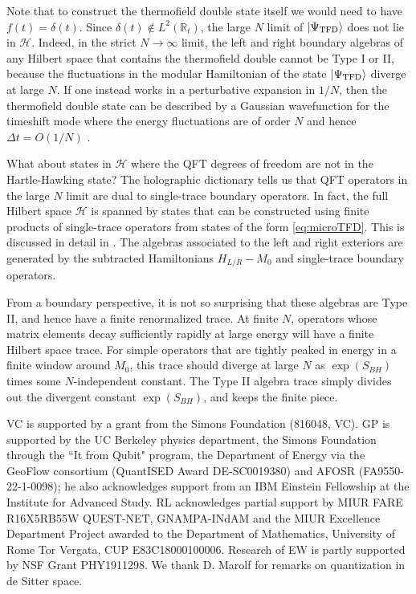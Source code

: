\documentclass[11pt,a4paper]{article}
\def\R{{\mathbb R}}
\def\TFD{{\mathrm{TFD}}}
\begin{document}
Note that to construct the thermofield double state itself we would need to have $f(t) = \delta(t)$. Since $\delta(t) \not\in L^2(\R_t)$, the large $N$ limit of $\ket{ \Psi_\TFD}$ does not lie in $\mathcal{H}$. Indeed, in the strict $N \to \infty$ limit, the left and right boundary algebras of any Hilbert space that contains the thermofield double cannot be Type I or II, because the fluctuations in the modular Hamiltonian of the state $\ket{\Psi_\TFD}$ diverge at large $N$. If one instead works in a perturbative expansion in $1/N$, then the thermofield double state  can be described by a Gaussian wavefunction for the timeshift mode where the energy fluctuations are of order $N$  and hence $\Delta t = O(1/N)$ \cite{GCP}. 

What about states in $\mathcal{H}$ where the QFT degrees of freedom are not in the Hartle-Hawking state? The holographic dictionary tells us that QFT operators in the large $N$ limit are dual to single-trace boundary operators. In fact, the full Hilbert space $\mathcal{H}$ is spanned by states that can be constructed using finite products of single-trace operators from states of the form \eqref{eq:microTFD}. This is discussed in detail in \cite{CPW}. The algebras associated to the left and right exteriors are generated by the subtracted Hamiltonians $H_{L/R} - M_0$ and single-trace boundary operators.

From a boundary perspective, it is not so surprising that these algebras are Type II, and hence have a finite renormalized trace. At finite $N$, operators whose matrix elements decay sufficiently rapidly at large energy will have a finite Hilbert space trace. For simple operators that are tightly peaked in energy in a finite window around $M_0$,  this trace should diverge at large $N$ as $\exp(S_{BH})$ times some $N$-independent constant. The Type II algebra trace simply divides out the divergent constant $\exp(S_{BH})$, and keeps the finite piece.

\vskip1cm


 VC
is supported by a grant from the Simons Foundation (816048, VC).
  GP is supported by the UC Berkeley physics department, the Simons Foundation through the ``It from Qubit" program, the Department of 
  Energy via the GeoFlow consortium (QuantISED Award DE-SC0019380) and AFOSR (FA9550-22-1-0098); he also acknowledges support from an 
  IBM Einstein Fellowship at the Institute for Advanced Study.
RL acknowledges partial support by MIUR FARE R16X5RB55W
QUEST-NET, GNAMPA-INdAM and the MIUR Excellence Department Project awarded to
the Department of Mathematics, University of Rome Tor Vergata, CUP E83C18000100006.
 Research of EW is partly supported by NSF Grant PHY1911298.
 We thank D. Marolf for
remarks on quantization in de Sitter space.
\end{document}
